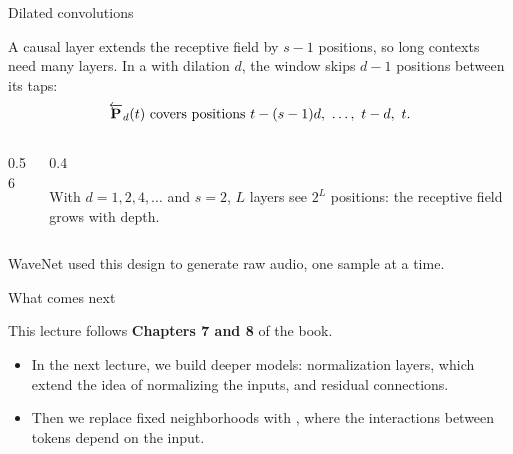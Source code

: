 \documentclass[11pt,aspectratio=169]{beamer}
\newcommand{\causalP}{\overleftarrow{\vc{P}}}
\begin{document}
\begin{whiteframe}{Dilated convolutions}
    \setlength{\parskip}{3pt}
    \setlength{\abovedisplayskip}{5pt}
    \setlength{\belowdisplayskip}{5pt}

    A causal layer extends the receptive field by $s-1$ positions, so long
    contexts need many layers. In a  with
    dilation $d$, the window skips $d-1$ positions between its taps:
    \[
        \causalP_d(t)\ \text{covers positions}\ t-(s-1)d,\ \ldots,\ t-d,\ t.
    \]

    \begin{columns}[c,onlytextwidth]
        \begin{column}{0.56\textwidth}
            \centering
            \scalebox{0.74}{}
        \end{column}
        \begin{column}{0.4\textwidth}
            \begin{tcolorbox}[nndsgreen]
                With $d=1,2,4,\ldots$ and $s=2$, $L$ layers see $2^L$ positions:
                the receptive field grows  with depth.
            \end{tcolorbox}
        \end{column}
    \end{columns}

    \medskip
    WaveNet used this design to generate raw audio, one sample at a time.


\end{whiteframe}



\begin{frame}{What comes next}
    \setlength{\parskip}{6pt}

    This lecture follows \textbf{Chapters 7 and 8} of the book.

    \begin{itemize}
        \item In the next lecture, we build deeper models: normalization
              layers, which extend the idea of normalizing the inputs, and
              residual connections.
        \item Then we replace fixed neighborhoods with ,
              where the interactions between tokens depend on the input.
    \end{itemize}

\end{frame}
\end{document}
